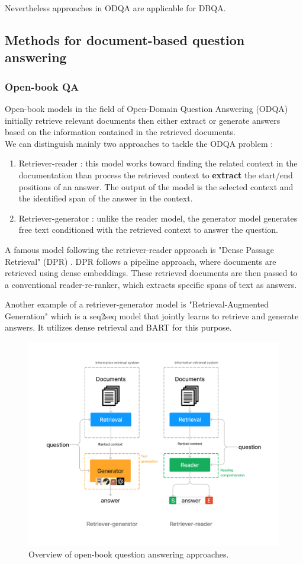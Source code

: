 \documentclass[a4paper,12pt]{article}
\begin{document}
Nevertheless approaches in ODQA are applicable for DBQA.

\subsection{Methods for document-based question answering}
\subsubsection{Open-book QA}
Open-book models in the field of Open-Domain Question Answering (ODQA) initially retrieve relevant documents then either extract or generate answers based on the information contained in the retrieved documents. \\
We can distinguish mainly two approaches to tackle the ODQA problem :

\begin{enumerate}
	\item Retriever-reader : this model works toward finding the related context in the documentation than process the retrieved context to \textbf{extract} the start/end positions of an answer. The output of the model is the selected context and the identified span of the answer in the context. 
	\item Retriever-generator : unlike the reader model, the generator model generates free text conditioned with the retrieved context to answer the question.
\end{enumerate}

A famous model following the retriever-reader approach is "Dense Passage Retrieval" (DPR) \cite{dpr}. DPR follows a pipeline approach, where documents are retrieved using dense embeddings. 
These retrieved documents are then passed to a conventional reader-re-ranker, which extracts specific spans of text as answers.

Another example of a retriever-generator model is "Retrieval-Augmented Generation" \cite{rag} which is a seq2seq model that jointly learns to retrieve and generate answers. 
It utilizes dense retrieval and BART \cite{bart} for this purpose.


\begin{figure}[htbp]
	\centering
	\includegraphics[width=0.8\linewidth]{figures/openbook.png}
	\caption{Overview of open-book question answering approaches.}
	\label{fig:openbook}
\end{figure}
\end{document}
